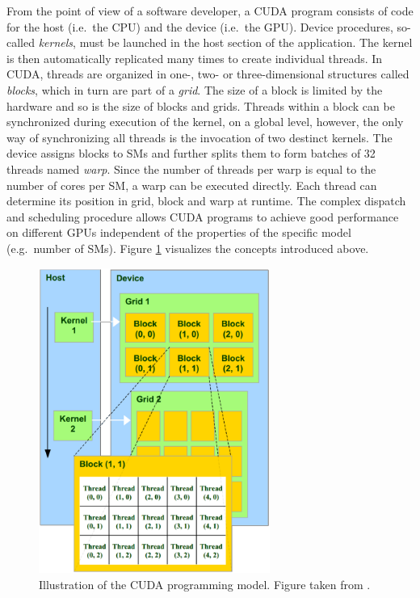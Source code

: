 From the point of view of a software developer, a CUDA program consists of code for the host (i.e.\ the CPU) and the device (i.e.\ the GPU). Device procedures, so-called \textit{kernels}, must be launched in the host section of the application. The kernel is then automatically replicated many times to create individual threads. In CUDA, threads are organized in one-, two- or three-dimensional structures called \textit{blocks}, which in turn are part of a \textit{grid}. The size of a block is limited by the hardware and so is the size of blocks and grids. Threads within a block can be synchronized during execution of the kernel, on a global level, however, the only way of synchronizing all threads is the invocation of two destinct kernels. The device assigns blocks to SMs and further splits them to form batches of 32 threads named \textit{warp}. Since the number of threads per warp is equal to the number of cores per SM, a warp can be executed directly. Each thread can determine its position in grid, block and warp at runtime. The complex dispatch and scheduling procedure allows CUDA programs to achieve good performance on different GPUs independent of the properties of the specific model (e.g.\ number of SMs). Figure \ref{fig:cuda_threads} visualizes the concepts introduced above. 

\begin{figure}
\centering
\includegraphics[height=10.0cm]{images/cuda_threads.eps}
\caption{Illustration of the CUDA programming model. Figure taken from \cite{nvidia_cuda_2012}.}
\label{fig:cuda_threads}
\end{figure}

